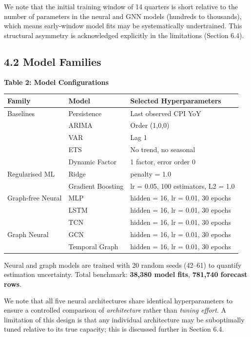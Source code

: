 \documentclass[
  11pt,
  a4paper]{article}
\newcounter{none} %
\begin{document}
We note that the initial training window of 14 quarters is short
relative to the number of parameters in the neural and GNN models
(hundreds to thousands), which means early-window model fits may be
systematically undertrained. This structural asymmetry is acknowledged
explicitly in the limitations (Section 6.4).

\subsection{4.2 Model Families}\label{model-families}

\textbf{Table 2: Model Configurations}

{\def\LTcaptype{none} %
\begin{longtable}[]{@{}lll@{}}
\toprule\noalign{}
Family & Model & Selected Hyperparameters \\
\midrule\noalign{}
\endhead
\bottomrule\noalign{}
\endlastfoot
Baselines & Persistence & Last observed CPI YoY \\
& ARIMA & Order (1,0,0) \\
& VAR & Lag 1 \\
& ETS & No trend, no seasonal \\
& Dynamic Factor & 1 factor, error order 0 \\
Regularised ML & Ridge & penalty = 1.0 \\
& Gradient Boosting & lr = 0.05, 100 estimators, L2 = 1.0 \\
Graph-free Neural & MLP & hidden = 16, lr = 0.01, 30 epochs \\
& LSTM & hidden = 16, lr = 0.01, 30 epochs \\
& TCN & hidden = 16, lr = 0.01, 30 epochs \\
Graph Neural & GCN & hidden = 16, lr = 0.01, 30 epochs \\
& Temporal Graph & hidden = 16, lr = 0.01, 30 epochs \\
\end{longtable}
}

Neural and graph models are trained with 20 random seeds (42--61) to
quantify estimation uncertainty. Total benchmark: \textbf{38,380 model
fits}, \textbf{781,740 forecast rows}.

We note that all five neural architectures share identical
hyperparameters to ensure a controlled comparison of \emph{architecture}
rather than \emph{tuning effort}. A limitation of this design is that
any individual architecture may be suboptimally tuned relative to its
true capacity; this is discussed further in Section 6.4.
\end{document}
